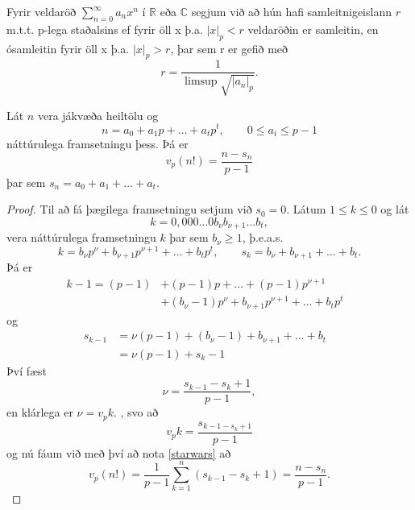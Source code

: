 Fyrir veldaröð $\sum_{n=0}^{\infty} a_nx^n$ í $\mathbb{R}$ eða $\mathbb{C}$ segjum við að hún hafi samleitnigeislann $r$ 
m.t.t. p-lega staðalsins ef fyrir öll x þ.a. $|x|_p < r$ veldaröðin er samleitin, en ósamleitin fyrir öll x þ.a. $|x|_p > r$, 
þar sem r er gefið með
\begin{equation*}
r = \frac{1}{\limsup \sqrt{|a_n|_p }}.
\end{equation*} 


\begin{hjalparsetn}
Lát $n$ vera jákvæða heiltölu og 
\begin{equation*}
n = a_0 + a_1p+ \ldots + a_tp^t, \qquad 0\leq a_i \leq p - 1
\end{equation*}
náttúrulega framsetningu þess. Þá er
\begin{equation*}
v_p(n!) = \frac{n - s_n}{p-1}
\end{equation*}
þar sem $s_n = a_0 + a_1 + \ldots + a_t$.
\end{hjalparsetn}
\begin{proof}
Til að fá þægilega framsetningu setjum við $s_0 = 0$. Látum $1\leq k \leq 0$ og lát
\begin{equation*}
k = 0,0 0 0 \ldots 0 b_\nu b_{\nu + 1} \ldots b_t ,  
\end{equation*}
vera náttúrulega framsetningu $k$ þar sem $b_\nu \geq 1$, þ.e.a.s. 
\begin{equation*}
k = b_\nu p^\nu + b_{\nu +1} p^{\nu+1} + \ldots + b_t p^t, \qquad s_k = b_\nu + b_{\nu+1} + \ldots + b_t.
\end{equation*}
Þá er 
\begin{align*}
k-1 = (p-1) & + (p-1)p + \ldots + (p-1)p^{\nu +1} &\\
 & + (b_\nu -1)p^\nu + b_{\nu+1} p^{\nu +1} + \ldots + b_t p^t &
\end{align*}
og 
\begin{align*}
s_{k-1} &= \nu(p-1) + (b_\nu -1) + b_{\nu+1} + \ldots + b_t & \\
 &  = \nu(p-1) + s_k -1 &
\end{align*}
Því fæst
\begin{equation*}
\nu = \frac{s_{k-1}-s_k + 1}{p-1 },
\end{equation*}
en klárlega er $\nu = v_p k.$ , svo að
\begin{equation*}
v_p k = \frac{s_{k-1 - s_k +1}}{p-1}
\end{equation*}
og nú fáum við með því að nota \ref{starwars} að 
\begin{equation*}
v_p(n!) = \frac{1}{p-1} \sum_{k=1}^n (s_{k-1} - s_k +1) = \frac{n - s_n}{p-1}.
\end{equation*}
\end{proof}

